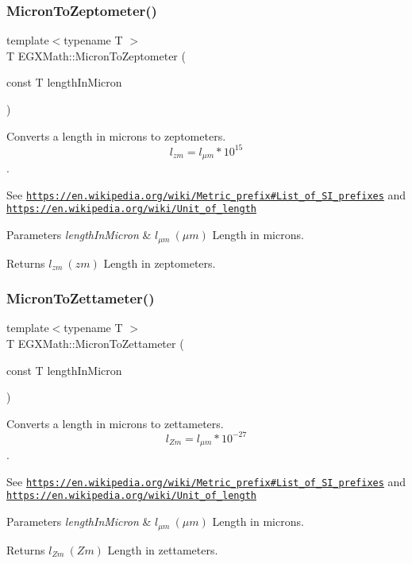\subsubsection{\texorpdfstring{Micron\+To\+Zeptometer()}{MicronToZeptometer()}}
{\footnotesize\ttfamily template$<$typename T $>$ \\
T E\+G\+X\+Math\+::\+Micron\+To\+Zeptometer (\begin{DoxyParamCaption}\item[{const T}]{length\+In\+Micron }\end{DoxyParamCaption})}



Converts a length in microns to zeptometers. \[ l_{zm}=l_{\mu m} * 10^{15} \]. 

See \href{https://en.wikipedia.org/wiki/Metric_prefix#List_of_SI_prefixes}{\tt https\+://en.\+wikipedia.\+org/wiki/\+Metric\+\_\+prefix\#\+List\+\_\+of\+\_\+\+S\+I\+\_\+prefixes} and \href{https://en.wikipedia.org/wiki/Unit_of_length}{\tt https\+://en.\+wikipedia.\+org/wiki/\+Unit\+\_\+of\+\_\+length} 
\begin{DoxyParams}{Parameters}
{\em length\+In\+Micron} & $ l_{\mu m}\ (\mu m)$ Length in microns. \\
\hline
\end{DoxyParams}
\begin{DoxyReturn}{Returns}
$ l_{zm}\ (zm)$ Length in zeptometers. 
\end{DoxyReturn}
\mbox{\label{group___e_g_x_math-_conversions-_length_conversions-_non-_s_i-_micron-_s_i_gad70bec89cb8cae0a215e4f2c1b599c09}} 
\subsubsection{\texorpdfstring{Micron\+To\+Zettameter()}{MicronToZettameter()}}
{\footnotesize\ttfamily template$<$typename T $>$ \\
T E\+G\+X\+Math\+::\+Micron\+To\+Zettameter (\begin{DoxyParamCaption}\item[{const T}]{length\+In\+Micron }\end{DoxyParamCaption})}



Converts a length in microns to zettameters. \[ l_{Zm}=l_{\mu m} * 10^{-27} \]. 

See \href{https://en.wikipedia.org/wiki/Metric_prefix#List_of_SI_prefixes}{\tt https\+://en.\+wikipedia.\+org/wiki/\+Metric\+\_\+prefix\#\+List\+\_\+of\+\_\+\+S\+I\+\_\+prefixes} and \href{https://en.wikipedia.org/wiki/Unit_of_length}{\tt https\+://en.\+wikipedia.\+org/wiki/\+Unit\+\_\+of\+\_\+length} 
\begin{DoxyParams}{Parameters}
{\em length\+In\+Micron} & $ l_{\mu m}\ (\mu m)$ Length in microns. \\
\hline
\end{DoxyParams}
\begin{DoxyReturn}{Returns}
$ l_{Zm}\ (Zm)$ Length in zettameters. 
\end{DoxyReturn}
